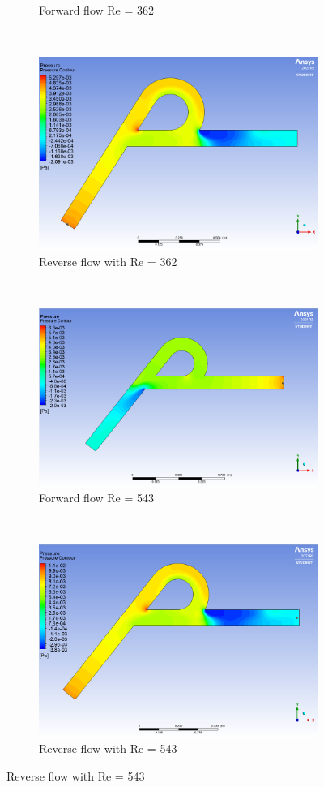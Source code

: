 \begin{figure}[H]
\begin{subfigure}{.45\textwidth}
  \caption{Forward flow Re = 362}
  \label{fig:x_d_norm}
\end{subfigure}%
~
\begin{subfigure}{.45\textwidth}
  \centering
  \includegraphics[width=.9\linewidth]{images/task2/L200/reverse362.png}
  \caption{Reverse flow with Re = 362}
  \label{fig:x_d_norm_actual}
\end{subfigure}
~
\begin{subfigure}{.45\textwidth}
  \centering
  \includegraphics[width=.9\linewidth]{images/task2/L200/forward543.png}
  \caption{Forward flow Re = 543}
  \label{fig:x_d_norm}
\end{subfigure}%
~
\begin{subfigure}{.45\textwidth}
  \centering
  \includegraphics[width=.9\linewidth]{images/task2/L200/reverse543.png}
  \caption{Reverse flow with Re = 543}
  \label{fig:x_d_norm_actual}
\end{subfigure}


\end{figure}
